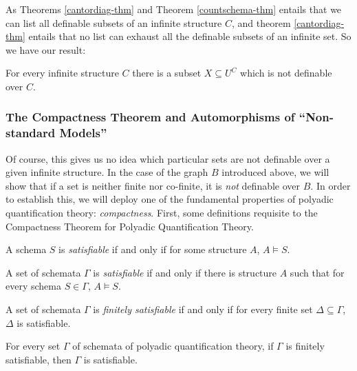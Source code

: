 As Theorems \ref{cantordiag-thm} and Theorem \ref{countschema-thm} entails that we can list all definable subsets of an infinite structure $C$, and theorem \ref{cantordiag-thm} entails that no list can exhaust all the definable subsets of an infinite set. So we have our result:

\begin{corollary}
For every infinite structure $C$ there is a subset $X\subseteq U^C$ which is not definable over $C$.
\end{corollary}

\subsubsection*{The Compactness Theorem and Automorphisms of ``Non-standard Models''}

Of course, this gives us no idea which particular sets are not definable over a given infinite structure. In the case of the graph $B$ introduced above, we will show that if a set is neither finite nor co-finite, it is \emph{not} definable over $B$. In order to establish this, we will deploy one of the fundamental properties of polyadic quantification theory: \emph{compactness}. First, some definitions requisite to the Compactness Theorem for Polyadic Quantification Theory.

\begin{definition}
A schema $S$ is \emph{satisfiable} if and only if for some structure $A$, $A\models S$.
\end{definition}

\begin{definition}
A set of schemata $\Gamma$ is \emph{satisfiable} if and only if there is structure $A$ such that for every schema $S\in \Gamma$, $A\models S$.
\end{definition}

\begin{definition}
A set of schemata $\Gamma$ is \emph{finitely satisfiable} if and only if for every finite set $\Delta\subseteq\Gamma$, $\Delta$ is satisfiable.
\end{definition}

\begin{theorem}\label{compact-thm}
For every set $\Gamma$ of schemata  of polyadic quantification theory, if $\Gamma$ is finitely satisfiable, then $\Gamma$ is satisfiable. 
\end{theorem}

